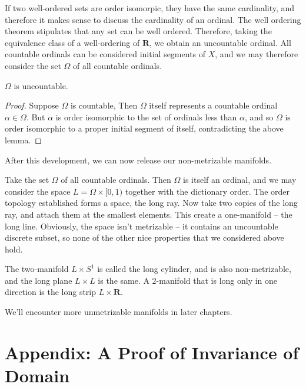 If two well-ordered sets are order isomorpic, they have the same cardinality, and therefore it makes sense to discuss the cardinality of an ordinal. The well ordering theorem stipulates that any set can be well ordered. Therefore, taking the equivalence class of a well-ordering of $\mathbf{R}$, we obtain an uncountable ordinal. All countable ordinals can be considered initial segments of $X$, and we may therefore consider the set $\Omega$ of all countable ordinals.

\begin{theorem}
    $\Omega$ is uncountable.
\end{theorem}
\begin{proof}
    Suppose $\Omega$ is countable, Then $\Omega$ itself represents a countable ordinal $\alpha \in \Omega$. But $\alpha$ is order isomorphic to the set of ordinals less than $\alpha$, and so $\Omega$ is order isomorphic to a proper initial segment of itself, contradicting the above lemma.
\end{proof}

After this development, we can now release our non-metrizable manifolds.

\begin{example}
    Take the set $\Omega$ of all countable ordinals. Then $\Omega$ is itself an ordinal, and we may consider the space $L = \Omega \times [0,1)$ together with the dictionary order. The order topology established forms a space, the long ray. Now take two copies of the long ray, and attach them at the smallest elements. This create a one-manifold -- the long line. Obviously, the space isn't metrizable -- it contains an uncountable discrete subset, so none of the other nice properties that we considered above hold.
\end{example}

\begin{example}
    The two-manifold $L \times S^1$ is called the long cylinder, and is also non-metrizable, and the long plane $L \times L$ is the same. A 2-manifold that is long only in one direction is the long strip $L \times \mathbf{R}$.
\end{example}

We'll encounter more unmetrizable manifolds in later chapters.

\newpage

\section{Appendix: A Proof of Invariance of Domain}


